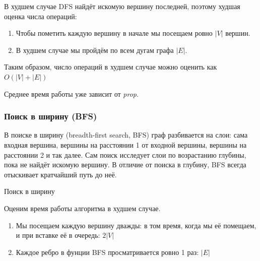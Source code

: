 В худшем случае DFS найдёт искомую вершину последней, поэтому худшая оценка числа операций:
\begin{enumerate}
    \item Чтобы пометить каждую вершину в начале мы посещаем ровно $|V|$ вершин.
    \item В худшем случае мы пройдём по всем дугам графа $|E|$.
\end{enumerate}

Таким образом, число операций в худшем случае можно оценить как $O(|V| + |E|)$

Среднее время работы уже зависит от \textit{prop}.

\subsubsection{Поиск в ширину (BFS)} \label{BFS-algo}

В поиске в ширину (breadth-first search, BFS) граф разбивается на слои: сама входная вершина, вершины на расстоянии 1 от входной вершины, вершины на расстоянии 2 и так далее. Сам поиск исследует слои по возрастанию глубины, пока не найдёт искомую вершину. В отличие от поиска в глубину, BFS всегда отыскивает кратчайший путь до неё.

\begin{algorithm}[H]
\SetAlgoLined
{}

\caption{Поиск в ширину} \label{algo:BFS}
\end{algorithm}

Оценим время работы алгоритма в худшем случае.
\begin{enumerate}
    \item Мы посещаем каждую вершину дважды: в том время, когда мы её помещаем, и при вставке её в очередь: $2|V|$
    \item Каждое ребро в фунции BFS просматривается ровно 1 раз: $|E|$
\end{enumerate}

